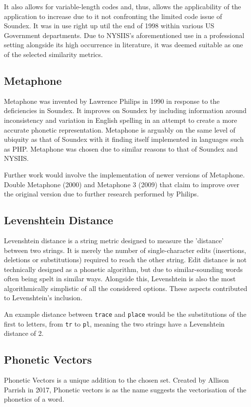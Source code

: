 It also allows for variable-length codes and, thus, allows the applicability of the application to increase due to it not confronting the limited code issue of Soundex. It was in use right up util the end of 1998 within various US Government departments. Due to NYSIIS's aforementioned use in a professional setting alongside its high occurrence in literature, it was deemed suitable as one of the selected similarity metrics.

\subsection{Metaphone}
Metaphone was invented by Lawrence Philips in 1990\cite{philips1990hanging} in response to the deficiencies in Soundex. It improves on Soundex by including information around inconsistency and variation in English spelling in an attempt to create a more accurate phonetic representation. Metaphone is arguably on the same level of ubiquity as that of Soundex with it finding itself implemented in languages such as PHP\cite{php}. Metaphone was chosen due to similar reasons to that of Soundex and NYSIIS. 

Further work would involve the implementation of newer versions of Metaphone. Double Metaphone (2000) and Metaphone 3 (2009) that claim to improve over the original version due to further research performed by Philips. 

\subsection{Levenshtein Distance}
Levenshtein distance is a string metric designed to measure the 'distance' between two strings. It is merely the number of single-character edits (insertions, deletions or substitutions) required to reach the other string. Edit distance is not technically designed as a phonetic algorithm, but due to similar-sounding words often being spelt in similar ways\cite{hettiarachchi2012sparcl}. Alongside this, Levenshtein is also the most algorithmically simplistic of all the considered options. These aspects contributed to Levenshtein's inclusion.

An example distance between \verb|trace| and \verb|place| would be the substitutions of the first to letters, from \verb|tr| to \verb|pl|, meaning the two strings have a Levenshtein distance of 2.

\subsection{Phonetic Vectors}
Phonetic Vectors is a unique addition to the chosen set. Created by Allison Parrish in 2017\cite{parrish2017poetic}, Phonetic vectors is as the name suggests the vectorisation of the phonetics of a word.

